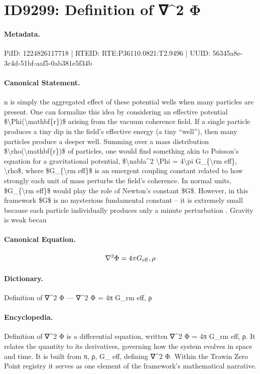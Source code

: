 \section*{ID9299: Definition of ∇\textasciicircum{}2 Φ}
\paragraph{Metadata.}
PiID: 1224826117718 | RTEID: RTE:P36110.0821:T2.9496 | UUID: 56345a8e-3c4d-51bf-aaf5-0ab381e5f34b

\paragraph{Canonical Statement.}
n is simply the aggregated effect of these potential wells when many particles are present. One can formalize this idea by considering an effective potential \$\textbackslash{}Phi(\textbackslash{}mathbf\{r\})\$ arising from the vacuum coherence field. If a single particle produces a tiny dip in the field’s effective energy (a tiny “well”), then many particles produce a deeper well. Summing over a mass distribution \$\textbackslash{}rho(\textbackslash{}mathbf\{r\})\$ of particles, one would find something akin to Poisson’s equation for a gravitational potential, \$\textbackslash{}nabla\textasciicircum{}2 \textbackslash{}Phi = 4\textbackslash{}pi G\_\{\textbackslash{}rm eff\}, \textbackslash{}rho\$, where \$G\_\{\textbackslash{}rm eff\}\$ is an emergent coupling constant related to how strongly each unit of mass perturbs the field’s coherence. In normal units, \$G\_\{\textbackslash{}rm eff\}\$ would play the role of Newton’s constant \$G\$. However, in this framework \$G\$ is no mysterious fundamental constant – it is extremely small because each particle individually produces only a minute perturbation . Gravity is weak becau

\paragraph{Canonical Equation.}
\[
\nabla^2 \Phi = 4\pi G_{\rm eff}, \rho
\]

\paragraph{Dictionary.}
Definition of ∇\textasciicircum{}2 Φ — ∇\textasciicircum{}2 Φ = 4π G\_rm eff, ρ

\paragraph{Encyclopedia.}
Definition of ∇\textasciicircum{}2 Φ is a differential equation, written ∇\textasciicircum{}2 Φ = 4π G\_rm eff, ρ. It relates the quantity to its derivatives, governing how the system evolves in space and time. It is built from π, ρ, G\_ eff, defining ∇\textasciicircum{}2 Φ. Within the Trawin Zero Point registry it serves as one element of the framework's mathematical narrative.
